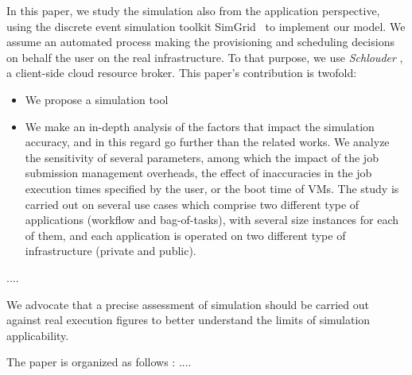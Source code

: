 In this  paper, we study the  simulation also from the  application perspective,
using  the   discrete  event  simulation  toolkit   SimGrid~\cite{simgrid08}  to
implement our model. We assume an  automated process making the provisioning and
scheduling decisions  on behalf the  user on  the real infrastructure.   To that
purpose,  we   use  \emph{Schlouder}  \cite{},  a   client-side  cloud  resource
broker. This  paper's contribution  is twofold:
\begin{itemize}
\item We propose a simulation tool
\item We make an  in-depth analysis  of the
factors that impact the simulation accuracy,  and in this regard go further than
the related works. We analyze the sensitivity of several parameters, among which
the  impact  of   the  job  submission  management  overheads,   the  effect  of
inaccuracies in the job execution times specified  by the user, or the boot time
of  VMs.  The  study is  carried out  on several  use cases  which comprise  two
different type  of applications (workflow  and bag-of-tasks), with  several size
instances for  each of them, and  each application is operated  on two different
type of infrastructure (private and public).
\end{itemize}

....

We advocate  that a precise assessment  of simulation
should be  carried out against real  execution figures to better  understand the
limits  of simulation  applicability. 

The paper is organized as follows : ....


\begin{comment}
These scheduling algorithms of Schlouder have been reimplemented in a simulation
system,  based on  the simulation  toolkit SimGrid~\cite{simgrid08}.   Our study
aims to isolate the different  parameters that influence the simulation accuracy
and what  degree of divergence  between real  execution and simulation  might be
expected in each case.
\end{comment}





